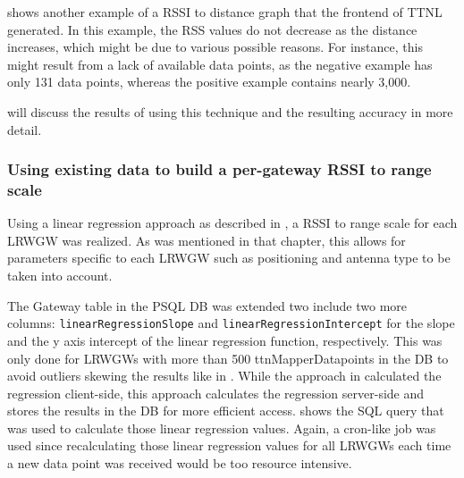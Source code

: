 shows another example of a \ac{RSSI} to distance graph that the frontend of \ac{TTNL} generated.
In this example, the \ac{RSS} values do not decrease as the distance increases, which might be due to various possible reasons.
For instance, this might result from a lack of available data points, as the negative example has only 131 data points, whereas the positive example contains nearly 3,000.

 will discuss the results of using this technique and the resulting accuracy in more detail.

\subsubsection{Using existing data to build a per-gateway \acs{RSSI} to range scale}\label{subsubsec:per-gateway-rssi-to-range-scale}

Using a linear regression approach as described in , a \ac{RSSI} to range scale for each \acl{LRWGW} was realized.
As was mentioned in that chapter, this allows for parameters specific to each \acl{LRWGW} such as positioning and antenna type to be taken into account.

The Gateway table in the \ac{PSQL} \ac{DB} was extended two include two more columns: \texttt{linear\-Regres\-sion\-Slope} and \texttt{linear\-Re\-gres\-sion\-Inter\-cept} for the slope and the y axis intercept of the linear regression function, respectively.
This was only done for \aclp{LRWGW} with more than 500 ttnMapperDatapoints in the \ac{DB} to avoid outliers skewing the results like in .
While the approach in  calculated the regression client-side, this approach calculates the regression server-side and stores the results in the \ac{DB} for more efficient access.
 shows the \ac{SQL} query that was used to calculate those linear regression values.
Again, a cron-like job was used since recalculating those linear regression values for all \aclp{LRWGW} each time a new data point was received would be too resource intensive.

